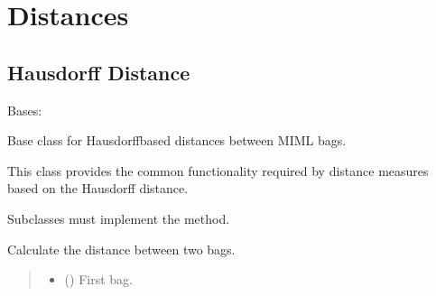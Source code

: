 \documentclass[letterpaper,10pt,english]{sphinxmanual}
\begin{document}
\sphinxstepscope


\chapter{Distances}
\label{\detokenize{core/index:distances}}\label{\detokenize{core/index::doc}}

\section{Hausdorff Distance}
\label{\detokenize{core/index:hausdorff-distance}}

\begin{fulllineitems}
\label{\detokenize{core/index:miml.core.hausdorff_distance.HausdorffDistance}}
\pysigstartsignatures
\pysigline
{}
\pysigstopsignatures
\sphinxAtStartPar
Bases: 

\sphinxAtStartPar
Base class for Hausdorff\sphinxhyphen{}based distances between MIML bags.

\sphinxAtStartPar
This class provides the common functionality required by distance
measures based on the Hausdorff distance.

\sphinxAtStartPar
Subclasses must implement the {\hyperref[\detokenize{core/index:miml.core.hausdorff_distance.HausdorffDistance.distance}]{}} method.

\begin{fulllineitems}
\label{\detokenize{core/index:miml.core.hausdorff_distance.HausdorffDistance.distance}}
\pysigstartsignatures
\pysiglinewithargsret
{}
{\sphinxparamcomma {}}
{}
\pysigstopsignatures
\sphinxAtStartPar
Calculate the distance between two bags.
\begin{quote}\begin{description}
\begin{itemize}
\item {} 
\sphinxAtStartPar
{} ({\hyperref[\detokenize{data/_autosummary/miml.data.bag.Bag:miml.data.bag.Bag}]{}}) \textendash{} First bag.


\end{itemize}
\end{description}
\end{quote}
\end{fulllineitems}
\end{fulllineitems}
\end{document}
